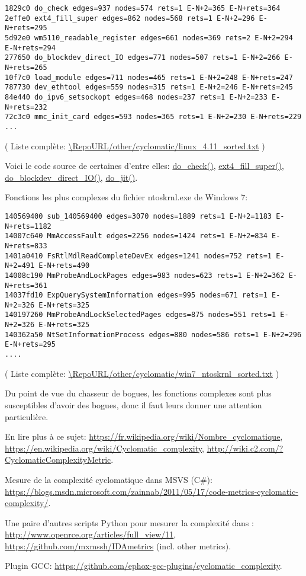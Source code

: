 \begin{lstlisting}
1829c0 do_check edges=937 nodes=574 rets=1 E-N+2=365 E-N+rets=364
2effe0 ext4_fill_super edges=862 nodes=568 rets=1 E-N+2=296 E-N+rets=295
5d92e0 wm5110_readable_register edges=661 nodes=369 rets=2 E-N+2=294 E-N+rets=294
277650 do_blockdev_direct_IO edges=771 nodes=507 rets=1 E-N+2=266 E-N+rets=265
10f7c0 load_module edges=711 nodes=465 rets=1 E-N+2=248 E-N+rets=247
787730 dev_ethtool edges=559 nodes=315 rets=1 E-N+2=246 E-N+rets=245
84e440 do_ipv6_setsockopt edges=468 nodes=237 rets=1 E-N+2=233 E-N+rets=232
72c3c0 mmc_init_card edges=593 nodes=365 rets=1 E-N+2=230 E-N+rets=229
...
\end{lstlisting}
( Liste complète: \url{\RepoURL/other/cyclomatic/linux_4.11_sorted.txt} )

Voici le code source de certaines d'entre elles:
\href{https://github.com/torvalds/linux/blob/56868a460b83c0f93d339256a81064d89aadae8e/kernel/bpf/verifier.c\#L2811}{do\_check()},
\href{https://github.com/torvalds/linux/blob/0fcc3ab23d7395f58e8ab0834e7913e2e4314a83/fs/ext4/super.c\#L3358}{ext4\_fill\_super()},
\href{https://github.com/torvalds/linux/blob/86292b33d4b79ee03e2f43ea0381ef85f077c760/fs/direct-io.c\#L1107}{do\_blockdev\_direct\_IO()},
\href{https://github.com/torvalds/linux/blob/bf5f89463f5b3109a72ed13ca62b57e90213387d/arch/x86/net/bpf_jit_comp.c\#L351}{do\_jit()}.

Fonctions les plus complexes du fichier ntoskrnl.exe de Windows 7:

\begin{lstlisting}
140569400 sub_140569400 edges=3070 nodes=1889 rets=1 E-N+2=1183 E-N+rets=1182
14007c640 MmAccessFault edges=2256 nodes=1424 rets=1 E-N+2=834 E-N+rets=833
1401a0410 FsRtlMdlReadCompleteDevEx edges=1241 nodes=752 rets=1 E-N+2=491 E-N+rets=490
14008c190 MmProbeAndLockPages edges=983 nodes=623 rets=1 E-N+2=362 E-N+rets=361
14037fd10 ExpQuerySystemInformation edges=995 nodes=671 rets=1 E-N+2=326 E-N+rets=325
140197260 MmProbeAndLockSelectedPages edges=875 nodes=551 rets=1 E-N+2=326 E-N+rets=325
140362a50 NtSetInformationProcess edges=880 nodes=586 rets=1 E-N+2=296 E-N+rets=295
....
\end{lstlisting}

( Liste complète: \url{\RepoURL/other/cyclomatic/win7_ntoskrnl_sorted.txt} )

Du point de vue du chasseur de bogues, les fonctions complexes sont plus susceptibles
d'avoir des bogues, donc il faut leurs donner une attention particulière.

En lire plus à ce sujet:
\url{https://fr.wikipedia.org/wiki/Nombre_cyclomatique},
\url{https://en.wikipedia.org/wiki/Cyclomatic_complexity},
\url{http://wiki.c2.com/?CyclomaticComplexityMetric}.

Mesure de la complexité cyclomatique dans MSVS (C\#):
\url{https://blogs.msdn.microsoft.com/zainnab/2011/05/17/code-metrics-cyclomatic-complexity/}.

Une paire d'autres scripts Python pour mesurer la complexité dans \IDA:
\url{http://www.openrce.org/articles/full_view/11},
\url{https://github.com/mxmssh/IDAmetrics} (incl. other metrics).

Plugin GCC:
\url{https://github.com/ephox-gcc-plugins/cyclomatic_complexity}.

